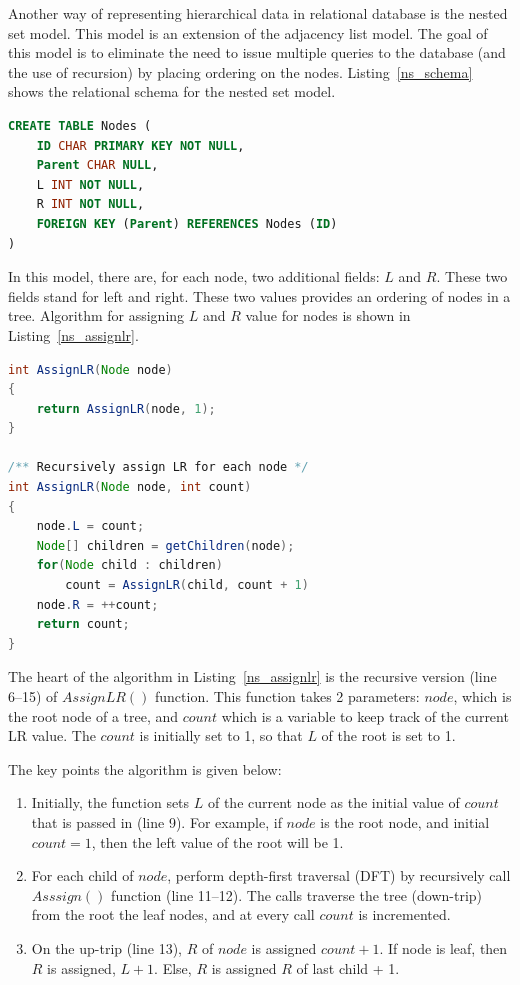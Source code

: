 Another way of representing hierarchical data in relational database is the nested set model\cite{journals/trj/Kamfonas92}. This model is an extension of the adjacency list model. The goal of this model is to eliminate the need to issue multiple queries to the database (and the use of recursion) by placing ordering on the nodes. Listing~\ref{ns_schema} shows the relational schema for the nested set model.

\begin{lstlisting}[language=sql,caption={Nodes table for nested set model},label=ns_schema]
CREATE TABLE Nodes (
    ID CHAR PRIMARY KEY NOT NULL,
    Parent CHAR NULL,
    L INT NOT NULL,
    R INT NOT NULL,
    FOREIGN KEY (Parent) REFERENCES Nodes (ID)
)
\end{lstlisting}	

In this model, there are, for each node, two additional fields: $L$ and $R$. These two fields stand for left and right. These two values provides an ordering of nodes in a tree. Algorithm for assigning $L$ and $R$ value for nodes is shown in Listing~\ref{ns_assignlr}.

\begin{lstlisting}[language=java, style=java, caption={Algorithm for Left-Right value assignment for nested set model},label=ns_assignlr]
int AssignLR(Node node)
{
    return AssignLR(node, 1);
}

/** Recursively assign LR for each node */
int AssignLR(Node node, int count)
{
	node.L = count;
	Node[] children = getChildren(node);
	for(Node child : children)
		count = AssignLR(child, count + 1)
	node.R = ++count;
	return count;
}
\end{lstlisting}

The heart of the algorithm in Listing~\ref{ns_assignlr} is the recursive version (line 6--15) of $AssignLR()$ function. This function takes 2 parameters: $node$, which is the root node of a tree, and $count$ which is a variable to keep track of the current LR value. The $count$ is initially set to 1, so that $L$ of the root is set to 1.

The key points the algorithm is given below:

\begin{enumerate}
\item Initially, the function sets $L$ of the current node as the initial value of $count$ that is passed in (line 9). For example, if $node$ is the root node, and initial $count = 1$, then the left value of the root will be 1.
\item For each child of $node$, perform depth-first traversal (DFT) by recursively call $Asssign()$ function (line 11--12). The calls traverse the tree (down-trip) from the root the leaf nodes, and at every call $count$ is incremented.
\item On the up-trip (line 13), $R$ of $node$ is assigned $count + 1$. If node is leaf, then $R$ is assigned, $L + 1$. Else, $R$ is assigned $R$ of last child + 1.
\end{enumerate}

